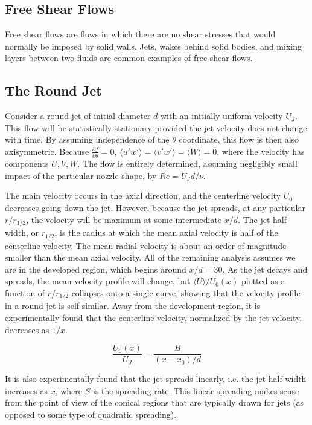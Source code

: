 \documentclass[10pt]{article}
\newcommand{\beq}{\begin{equation}}
\newcommand{\eeq}{\end{equation}}
\newcommand{\la}{\langle}
\newcommand{\ra}{\rangle}
\begin{document}
\begin{flushleft}
\section{Free Shear Flows}

Free shear flows are flows in which there are no shear stresses that would normally be imposed by solid walls. Jets, wakes behind solid bodies, and mixing layers between two fluids are common examples of free shear flows. 

\subsection{The Round Jet}
Consider a round jet of initial diameter \(d\) with an initially uniform velocity \(U_J\). This flow will be statistically stationary provided the jet velocity does not change with time. By assuming independence of the \(\theta\) coordinate, this flow is then also axisymmetric. Because \(\frac{\partial f}{\partial\theta}=0\), \(\la u'w'\ra=\la v'w'\ra=\la W\ra=0\), where the velocity has components \(U, V, W\). The flow is entirely determined, assuming negligibly small impact of the particular nozzle shape, by \(Re=U_Jd/\nu\). 

The main velocity occurs in the axial direction, and the centerline velocity \(U_0\) decreases going down the jet. However, because the jet spreads, at any particular \(r/r_{1/2}\), the velocity will be maximum at some intermediate \(x/d\). The jet half-width, or \(r_{1/2}\), is the radius at which the mean axial velocity is half of the centerline velocity. The mean radial velocity is about an order of magnitude smaller than the mean axial velocity. All of the remaining analysis assumes we are in the developed region, which begins around \(x/d=30\). As the jet decays and spreads, the mean velocity profile will change, but \(\la U\ra/U_0(x)\) plotted as a function of \(r/r_{1/2}\) collapses onto a single curve, showing that the velocity profile in a round jet is self-similar. Away from the development region, it is experimentally found that the centerline velocity, normalized by the jet velocity, decreases as \(1/x\). 

\beq
\label{eq:Uo}
\frac{U_0(x)}{U_J}=\frac{B}{(x-x_0)/d}
\eeq

It is also experimentally found that the jet spreads linearly, i.e. the jet half-width increases as \(x\), where \(S\) is the spreading rate. This linear spreading makes sense from the point of view of the conical regions that are typically drawn for jets (as opposed to some type of quadratic spreading). 


\end{flushleft}
\end{document}
